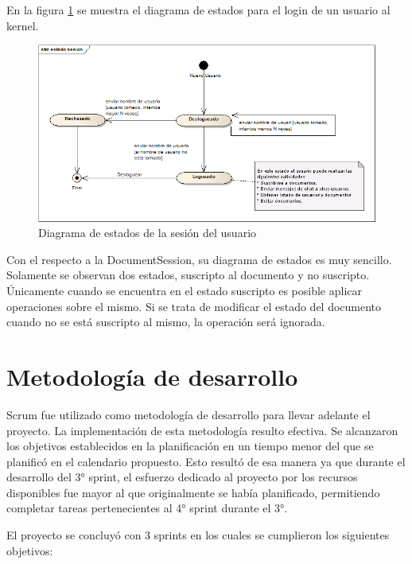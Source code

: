 \documentclass[12pt,a4paper]{article}
\begin{document}
En la figura \ref{estado-sesion} se muestra el diagrama de estados para el login de un usuario al kernel.

	\begin{figure}[!ht]
		\begin{center}
			\includegraphics[width=14cm]{estado-sesion.png}
			\caption{\label{estado-sesion} Diagrama de estados de la sesión del usuario }
		\end{center}
	\end{figure}

Con el respecto a la DocumentSession, su diagrama de estados es muy sencillo. Solamente se observan dos estados, suscripto al
documento y no suscripto. Únicamente cuando se encuentra en el estado suscripto es posible aplicar operaciones sobre el mismo.
Si se trata de modificar el estado del documento cuando no se está suscripto al mismo, la operación será ignorada.

\section{Metodología de desarrollo}

Scrum fue utilizado como metodología de desarrollo para llevar adelante el proyecto. La implementación de esta metodología
resulto efectiva. Se alcanzaron los objetivos establecidos en la planificación en un tiempo menor del que se planificó en
el calendario propuesto. Esto resultó de esa manera ya que durante el desarrollo del 3° sprint, el esfuerzo dedicado al proyecto
por los recursos disponibles fue mayor al que originalmente se había planificado, permitiendo completar tareas pertenecientes
al 4° sprint durante el 3°.

El proyecto se concluyó con 3 sprints en los cuales se cumplieron los siguientes objetivos:
\end{document}
